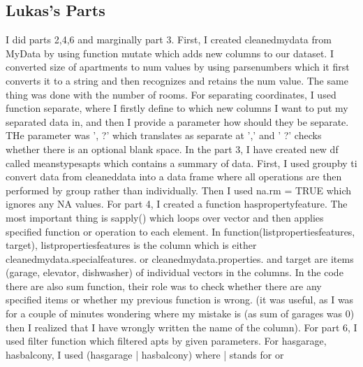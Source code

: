 \documentclass{article}
\begin{document}
\subsection*{Lukas's Parts}
I did parts 2,4,6 and marginally part 3. First, I created cleanedmydata from MyData by using function mutate which adds new columns to our dataset. I converted size of apartments to num values by using parsenumbers which it first converts it to a string and then recognizes and retains the num value. The same thing was done with the number of rooms. For separating coordinates, I used function separate, where I firstly define to which new columns I want to put my separated data in, and then I provide a parameter how should they be separate. THe parameter was ', ?' which translates as separate at ',' and ' ?' checks whether there is an optional blank space.
In the part 3, I have created new df called meanstypesapts which contains a summary of data. First, I used groupby ti convert data from cleaneddata into a data frame where all operations are then performed by group rather than individually. Then I used na.rm = TRUE which ignores any NA values.
For part 4, I created a function haspropertyfeature. The most important thing is sapply() which loops over vector and then applies specified function or operation to each element. In function(listpropertiesfeatures, target), listpropertiesfeatures is the column which is either cleanedmydata.specialfeatures. or cleanedmydata.properties. and target are items (garage, elevator, dishwasher) of individual vectors in the columns.
In the code there are also sum function, their role was to check whether there are any specified items or whether my previous function is wrong. (it was useful, as I was for a couple of minutes wondering where my mistake is (as sum of garages was 0) then I realized that I have wrongly written the name of the column).
For part 6, I used filter function which filtered apts by given parameters. For hasgarage, hasbalcony, I used (hasgarage | hasbalcony) where | stands for or
\end{document}
